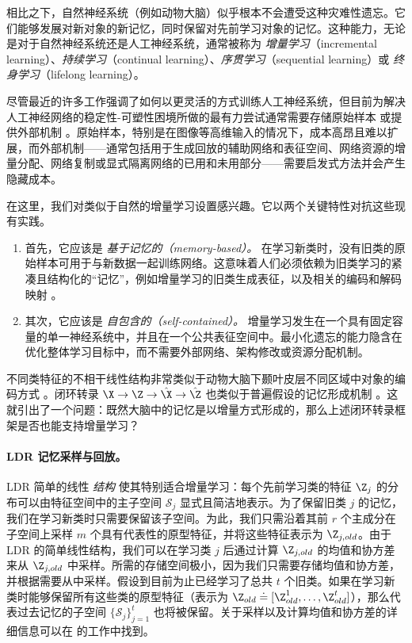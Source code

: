 \documentclass[../../book-main_zh.tex]{subfiles}
\begin{document}
相比之下，自然神经系统（例如动物大脑）似乎根本不会遭受这种灾难性遗忘。它们能够发展对新对象的新记忆，同时保留对先前学习对象的记忆。这种能力，无论是对于自然神经系统还是人工神经系统，通常被称为 {\em 增量学习}（incremental learning）、{\em 持续学习}（continual learning）、{\em 序贯学习}（sequential learning）或 {\em 终身学习}（lifelong learning）\cite{controlled-forgetting}。

尽管最近的许多工作强调了如何以更灵活的方式训练人工神经系统，但目前为解决人工神经网络的稳定性-可塑性困境所做的最有力尝试通常需要存储原始样本 \cite{icarl,chaudhry2019tiny} 或提供外部机制 \cite{EWC}。原始样本，特别是在图像等高维输入的情况下，成本高昂且难以扩展，而外部机制——通常包括用于生成回放的辅助网络和表征空间、网络资源的增量分配、网络复制或显式隔离网络的已用和未用部分——需要启发式方法并会产生隐藏成本。

在这里，我们对类似于自然的增量学习设置感兴趣。它以两个关键特性对抗这些现有实践。
\begin{enumerate}
    \item 首先，它应该是 \emph{基于记忆的（memory-based）。} 在学习新类时，没有旧类的原始样本可用于与新数据一起训练网络。这意味着人们必须依赖为旧类学习的紧凑且结构化的“记忆”，例如增量学习的旧类生成表征，以及相关的编码和解码映射 \cite{fearnet}。
    \item 其次，它应该是 \emph{自包含的（self-contained）。} 增量学习发生在一个具有固定容量的单一神经系统中，并且在一个公共表征空间中。最小化遗忘的能力隐含在优化整体学习目标中，而不需要外部网络、架构修改或资源分配机制。
\end{enumerate}

不同类特征的不相干线性结构非常类似于动物大脑下颞叶皮层不同区域中对象的编码方式 \cite{Chang-Cell-2017,Bao2020AMO}。闭环转录 $\X \rightarrow \Z \rightarrow \hat{\X} \rightarrow \hat{\Z}$ 也类似于普遍假设的记忆形成机制 \cite{2020Vandeven,Josselyn2020MemoryER}。这就引出了一个问题：既然大脑中的记忆是以增量方式形成的，那么上述闭环转录框架是否也能支持增量学习？

\paragraph{LDR 记忆采样与回放。} LDR 简单的线性 {\em 结构} 使其特别适合增量学习：每个先前学习类的特征 $\Z_j$ 的分布可以由特征空间中的主子空间 $\mathcal{S}_j$ 显式且简洁地表示。为了保留旧类 $j$ 的记忆，我们在学习新类时只需要保留该子空间。为此，我们只需沿着其前 $r$ 个主成分在子空间上采样 $m$ 个具有代表性的原型特征，并将这些特征表示为 $\Z_{j,old}$。由于 LDR 的简单线性结构，我们可以在学习类 $j$ 后通过计算 $\Z_{j,old}$ 的均值和协方差来从 $\Z_{j,old}$ 中采样。所需的存储空间极小，因为我们只需要存储均值和协方差，并根据需要从中采样。假设到目前为止已经学习了总共 $t$ 个旧类。如果在学习新类时能够保留所有这些类的原型特征（表示为 $\Z_{old} \doteq [\Z^1_{old},\ldots, \Z^t_{old}]$），那么代表过去记忆的子空间 $\{\mathcal{S}_j\}_{j=1}^t$ 也将被保留。关于采样以及计算均值和协方差的详细信息可以在 \cite{tong2023incremental} 的工作中找到。
\end{document}
